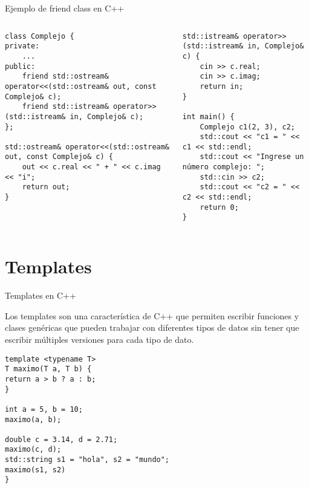\documentclass{beamer}
\begin{document}
\begin{frame}[fragile]{Ejemplo de friend class en C++}
\begin{columns}
  \begin{column}{0.5\textwidth}
\begin{verbatim}
class Complejo {
private:
    ...
public:
    friend std::ostream& operator<<(std::ostream& out, const Complejo& c);
    friend std::istream& operator>>(std::istream& in, Complejo& c);
};

std::ostream& operator<<(std::ostream& out, const Complejo& c) {
    out << c.real << " + " << c.imag << "i";
    return out;
}
    \end{verbatim}
  \end{column}
  \begin{column}{0.5\textwidth}
    \begin{verbatim}
std::istream& operator>>(std::istream& in, Complejo& c) {
    cin >> c.real;
    cin >> c.imag;
    return in;
}

int main() {
    Complejo c1(2, 3), c2;
    std::cout << "c1 = " << c1 << std::endl;
    std::cout << "Ingrese un número complejo: ";
    std::cin >> c2;
    std::cout << "c2 = " << c2 << std::endl;
    return 0;
}
    \end{verbatim}
  \end{column}
\end{columns}

\end{frame}


\section{Templates}

\begin{frame}[fragile]{Templates en C++}

Los templates son una característica de C++ que permiten escribir funciones y clases genéricas que pueden trabajar con diferentes tipos de datos sin tener que escribir múltiples versiones para cada tipo de dato.

\begin{verbatim}
template <typename T>
T maximo(T a, T b) {
return a > b ? a : b;
}

int a = 5, b = 10;
maximo(a, b);

double c = 3.14, d = 2.71;
maximo(c, d);
std::string s1 = "hola", s2 = "mundo";
maximo(s1, s2)
}
\end{verbatim}

\end{frame}
\end{document}
